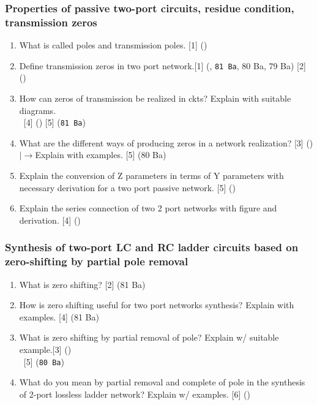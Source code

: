 \documentclass[12pt]{article}
\newcommand{\lb}{\\$\left|\rightarrow\right.$}
\newcommand{\enter}{\\\textcolor{white}{1}}
\begin{document}
\subsubsection{Properties of passive two-port circuits, residue condition, transmission zeros}
\begin{enumerate}
	\item What is called poles and transmission poles. \hfill [1] ()

	\item Define transmission zeros in two port network.\hfill [1] (, \texttt{81 Ba}, 80 Ba, 79 Ba) [2] ()
	
	\item How can zeros of transmission be realized in ckts? Explain with suitable diagrams.
	\enter\hfill [4] () [5] (\texttt{81 Ba})
	
	\item What are the different ways of producing zeros in a network realization? \hfill [3] ()
	\lb Explain with examples. \hfill [5] (80 Ba)

	\item Explain the conversion of Z parameters in terms of Y parameters with necessary derivation for a two port passive network. \hfill [5] ()	
	
	\item Explain the series connection of two 2 port networks with figure and derivation. \hfill [4] ()
\end{enumerate}
\subsubsection{Synthesis of two-port LC and RC ladder circuits based on zero-shifting by partial pole removal}
\begin{enumerate}
	\item What is zero shifting? \hfill [2] (81 Ba)
	
	\item How is zero shifting useful for two port networks synthesis? Explain with examples. \hfill [4] (81 Ba)
	
	\item What is zero shifting by partial removal of pole? Explain w/ suitable example.\hfill [3] ()
\enter\hfill [5] (\texttt{80 Ba})

	\item What do you mean by partial removal and complete of pole in the synthesis of 2-port lossless ladder network? Explain w/ examples. \hfill [6] ()
\end{enumerate}
\end{document}
